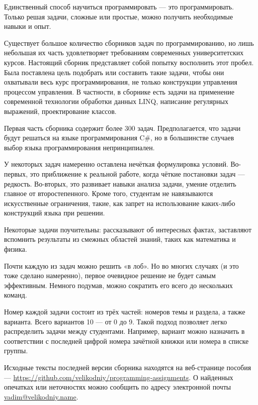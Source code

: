 
Единственный способ научиться программировать — это
программировать. Только решая задачи, сложные или простые, можно
получить необходимые навыки и опыт.

Существует большое количество сборников задач по программированию, но
лишь небольшая их часть удовлетворяет требованиям современных
университетских курсов. Настоящий сборник представляет собой попытку
восполнить этот пробел. Была поставлена цель подобрать или составить
такие задачи, чтобы они охватывали весь курс программирования, не
только конструкции управления процессом управления. В частности, в
сборнике есть задачи на применение современной технологии обработки
данных LINQ, написание регулярных выражений, проектирование классов.


Первая часть сборника содержит более 300 задач. Предполагается, что
задачи будут решаться на языке программирования C\#, но в большинстве
случаев выбор языка программирования непринципиален.

У некоторых задач намеренно оставлена нечёткая формулировка
условий. Во-первых, это приближение к реальной работе, когда чёткие
постановки задач — редкость. Во-вторых, это развивает навыки анализа
задачи, умение отделить главное от второстепенного. Кроме того,
студентам не навязываются искусственные ограничения, такие, как запрет
на использование каких-либо конструкций языка при решении.

Некоторые задачи поучительны: рассказывают об интересных фактах,
заставляют вспомнить результаты из смежных областей знаний, таких как
математика и физика.

Почти каждую из задач можно решить «в лоб». Но во многих случаях (и
это тоже сделано намеренно), первое очевидное решение не будет самым
эффективным. Немного подумав, можно сократить его всего до нескольких
команд.

Номер каждой задачи состоит из трёх частей: номеров темы и раздела, а
также варианта. Всего вариантов 10 — от 0 до 9. Такой подход позволяет
легко распределить задачи между студентами. Например, вариант можно
назначить в соответствии с последней цифрой номера зачётной книжки или
номера в списке группы.




Исходные тексты последней версии сборника находятся на веб-странице
пособия —
\url{https://github.com/velikodniy/programming-assignments}. О найденных
опечатках или неточностях можно сообщить по адресу электронной почты
\href{mailto:vadim@veikodniy.name}{vadim@velikodniy.name}.
